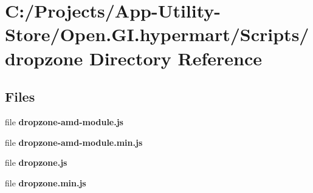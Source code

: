 \section{C\+:/\+Projects/\+App-\/\+Utility-\/\+Store/\+Open.G\+I.\+hypermart/\+Scripts/dropzone Directory Reference}
\label{dir_569c635c72a770996239f1c522cfc415}
\subsection*{Files}
\begin{DoxyCompactItemize}
\item 
file \textbf{ dropzone-\/amd-\/module.\+js}
\item 
file \textbf{ dropzone-\/amd-\/module.\+min.\+js}
\item 
file \textbf{ dropzone.\+js}
\item 
file \textbf{ dropzone.\+min.\+js}
\end{DoxyCompactItemize}

